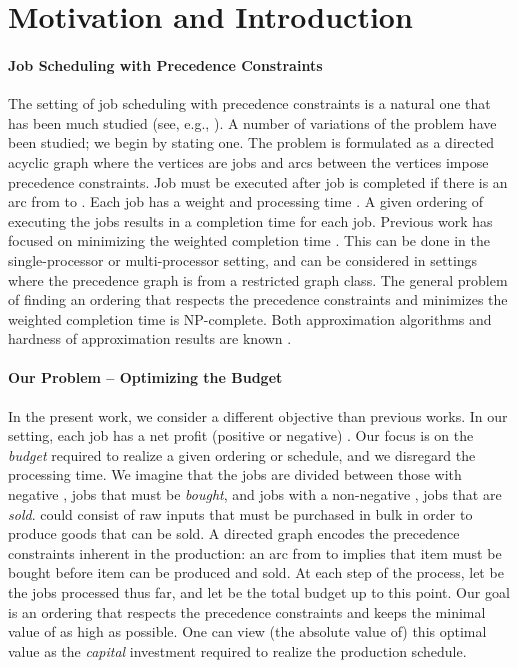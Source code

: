 \documentclass[letterpaper,11pt,abstracton]{scrartcl}
\begin{document}
\section{Motivation and Introduction}\label{sec:intro}

\paragraph{Job Scheduling with Precedence Constraints}
The setting of job scheduling with precedence constraints is a natural
one that has been much studied (see, e.g., \cite{CS05,MMS04}).  A number of
variations of the problem have been studied; we begin by stating one.
The problem is formulated as a directed acyclic graph where
the vertices are jobs and arcs between the vertices impose precedence
constraints.  Job  must be executed after job  is completed if
there is an arc from  to .  Each job  has a weight  and
processing time .  A given ordering of executing the jobs results
in a completion time  for each job.  Previous work has focused on
minimizing the weighted completion time .
This can be done in the single-processor or multi-processor setting,
and can be considered in settings where the precedence graph is from
a restricted graph class.  The general problem of finding an ordering that
respects the precedence constraints and minimizes the weighted
completion time is NP-complete.  Both approximation algorithms and
hardness of approximation results are known \cite{AMMS11,AMS07,MMS04,woginger1}.



\paragraph{Our Problem -- Optimizing the Budget}
In the present work, we consider a different objective than previous
works.  In our setting, each job  has a net profit (positive or
negative) .  Our focus is on the \emph{budget} required to
realize a given ordering or schedule, and we disregard the processing
time.  We imagine that the jobs are divided between those with negative
, jobs  that must be \emph{bought}, and jobs with a non-negative
, jobs  that are \emph{sold}.   could consist of raw inputs
that must be purchased in bulk in order to produce goods  that
can be sold.  A directed graph
 encodes the precedence constraints inherent in the
production: an arc from  to  implies that item 
must be bought before item  can be produced and sold.
At each step  of the process, let  be the jobs processed
thus far, and let  be the total budget
up to this point.  Our goal is an ordering that respects the precedence
constraints and keeps the minimal value of  as high as possible.
One can view (the absolute value of) this optimal value as the \emph{capital} investment required
to realize the production schedule.
\end{document}
